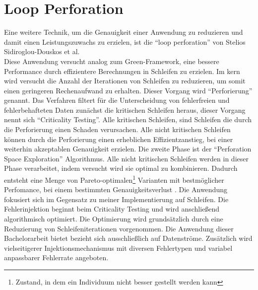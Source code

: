 \section{Loop Perforation}
Eine weitere Technik, um die Genauigkeit einer Anwendung zu reduzieren und damit einen Leistungszuwachs zu erzielen, ist die ``loop perforation'' von Stelios Sidiroglou-Douskos  et al.\\
Diese Anwendung versucht analog zum Green-Framework, eine bessere Performance durch effizientere Berechnungen in Schleifen zu erzielen. Im kern wird versucht die Anzahl der Iterationen von Schleifen zu reduzieren, um somit einen geringeren Rechenaufwand zu erhalten. Dieser Vorgang wird ``Perforierung'' genannt. Das Verfahren filtert f\"ur die Unterscheidung von fehlerfreien und fehlerbehafteten Daten zun\"achst die kritischen Schleifen heraus, dieser Vorgang nennt sich ``Criticality Testing''. Alle kritischen Schleifen, sind Schleifen die durch die Perforierung einen Schaden verursachen. Alle nicht kritischen Schleifen k\"onnen durch die Perforierung einen erheblichen Effizientzanstieg, bei einer weiterhin akzeptablen Genauigkeit erzielen. Die zweite Phase ist der ``Perforation Space Exploration'' Algorithmus. Alle nicht kritischen Schleifen werden in dieser Phase verarbeitet, indem versucht wird sie optimal zu kombinieren. Dadurch entsteht eine Menge von Pareto-optimalen\footnote{Zustand, in dem ein Individuum nicht besser gestellt werden kann} Varianten mit bestm\"oglicher Perfomance, bei einem bestimmten Genauigkeitsverlust \cite{loopPerforation}. Die Anwendung fokusiert sich im Gegensatz zu meiner Implementierung auf Schleifen. Die Fehlerinjektion beginnt beim Criticality Testing und wird anschlie\ss end algorithmisch optimiert. Die Optimierung wird grunds\"atzlich durch eine Reduzierung von Schleifeniterationen vorgenommen. Die Anwendung dieser Bachelorarbeit bietet bezieht sich ausschlie\ss lich auf Datenströme. Zusätzlich wird vielseitigerer Injektionsmechanismus mit diversen Fehlertypen und variabel anpassbarer Fehlerrate angeboten. 